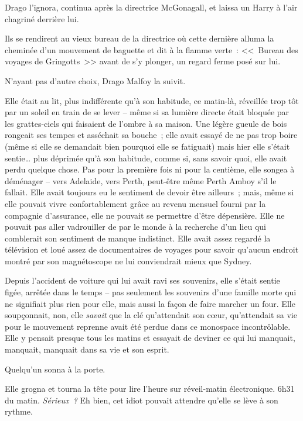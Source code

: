 Drago l'ignora, continua après la directrice McGonagall, et laissa un Harry à l'air chagriné derrière lui.

Ils se rendirent au vieux bureau de la directrice où cette dernière alluma la cheminée d'un mouvement de baguette et dit à la flamme verte~: <<~Bureau des voyages de Gringotts~>> avant de s'y plonger, un regard ferme posé sur lui.

N'ayant pas d'autre choix, Drago Malfoy la suivit.

\later

Elle était au lit, plus indifférente qu'à son habitude, ce matin-là, réveillée trop tôt par un soleil en train de se lever -- même si sa lumière directe était bloquée par les grattes-ciels qui faisaient de l'ombre à sa maison. Une légère gueule de bois rongeait ses tempes et asséchait sa bouche~; elle avait essayé de ne pas trop boire (même si elle se demandait bien pourquoi elle se fatiguait) mais hier elle s'était sentie… plus déprimée qu'à son habitude, comme si, sans savoir quoi, elle avait perdu quelque chose. Pas pour la première fois ni pour la centième, elle songea à déménager -- vers Adelaide, vers Perth, peut-être même Perth Amboy s'il le fallait. Elle avait toujours eu le sentiment de devoir être ailleurs~; mais, même si elle pouvait vivre confortablement grâce au revenu mensuel fourni par la compagnie d'assurance, elle ne pouvait se permettre d'être dépensière. Elle ne pouvait pas aller vadrouiller de par le monde à la recherche d'un lieu qui comblerait son sentiment de manque indistinct. Elle avait assez regardé la télévision et loué assez de documentaires de voyages pour savoir qu'aucun endroit montré par son magnétoscope ne lui conviendrait mieux que Sydney.

Depuis l'accident de voiture qui lui avait ravi ses souvenirs, elle s'était sentie figée, arrêtée dans le temps -- pas seulement les souvenirs d'une famille morte qui ne signifiait plus rien pour elle, mais aussi la façon de faire marcher un four. Elle soupçonnait, non, elle \emph{savait} que la clé qu'attendait son cœur, qu'attendait sa vie pour le mouvement reprenne avait été perdue dans ce monospace incontrôlable. Elle y pensait presque tous les matins et essayait de deviner ce qui lui manquait, manquait, manquait dans sa vie et son esprit.

Quelqu'un sonna à la porte.

Elle grogna et tourna la tête pour lire l'heure sur réveil-matin électronique. 6h31 du matin. \emph{Sérieux~?} Eh bien, cet idiot pouvait attendre qu'elle se lève à son rythme.


